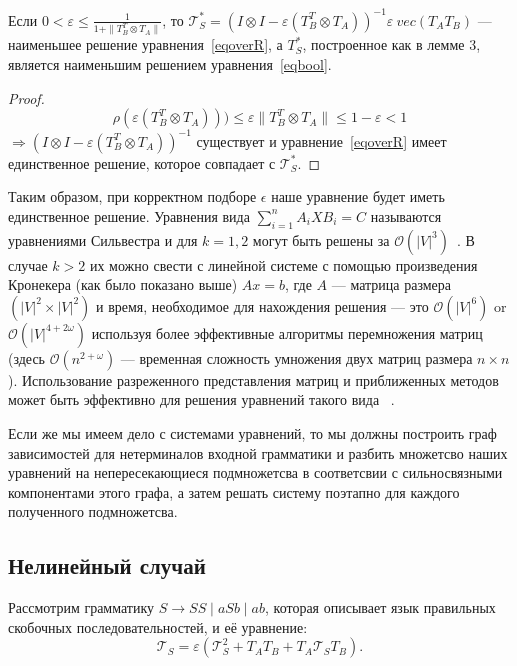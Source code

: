 \documentclass[12pt]{matmex-diploma-custom}
\begin{document}
\begin{theorem}
Если $\displaystyle  0 < \varepsilon \leq \frac{1}{1 + \| T_B^T \otimes T_A\|}$, то $\mathcal{T}_S^* = (I \otimes I - \varepsilon (T_B^T \otimes T_A))^{-1} \varepsilon \ vec(T_AT_B)$ --- наименьшее решение  уравнения~\ref{eqoverR}, а $T_S^*$, построенное как в лемме 3, является наименьшим решением уравнения~\ref{eqbool}.
\end{theorem}

\begin{proof}
$$\mathbb{\rho} (\varepsilon (T_B^T \otimes T_A))) \leq \varepsilon \|T_B^T \otimes T_A\|  \leq 1 -\varepsilon < 1$$ 
$\Rightarrow (I \otimes I - \varepsilon (T_B^T \otimes T_A))^{-1}$ существует и уравнение~\ref{eqoverR} имеет единственное решение, которое совпадает с $\mathcal{T}_S^*$. 
\end{proof}

Таким образом, при корректном подборе $\epsilon$ наше уравнение будет иметь единственное решение. 
Уравнения вида $\sum_{i=1}^n A_iXB_i = C$ называются уравнениями Сильвестра и для $k = 1, 2$ могут быть решены за  $\mathcal{O}(|V|^3)$~\cite{Bartels:1972:SME:361573.361582}. 
В случае $k > 2$ их можно свести с линейной системе с помощью произведения Кронекера (как было показано выше) $Ax = b$, где $A$ --- матрица размера  $(|V|^2\times|V|^2)$ и время, необходимое для нахождения решения --- это  $\mathcal{O}(|V|^6)$ or $\mathcal{O}(|V|^{4+2\omega})$ используя более эффективные алгоритмы перемножения матриц (здесь $\mathcal{O}(n^{2+\omega})$ --- временная сложность умножения двух матриц размера $n \times n$).
Использование разреженного представления матриц и приближенных методов может быть эффективно для решения уравнений такого вида ~\cite{bouhamidi2008}.

Если же мы имеем дело с системами уравнений, то мы должны построить граф зависимостей для нетерминалов входной грамматики и разбить множетсво наших уравнений на непересекающиеся подмножетсва в соответсвии с сильносвязными компонентами этого графа, а затем решать систему поэтапно для каждого полученного подмножетсва.


\subsection{Нелинейный случай}

Рассмотрим грамматику $S \rightarrow SS \mid aSb \mid ab$, которая описывает язык правильных скобочных последовательностей, и её уравнение:
\begin{equation*}
    \mathcal{T}_S = \varepsilon (\mathcal{T}^2_S +  T_AT_B + T_A\mathcal{T}_S T_B).
\end{equation*}
\end{document}
